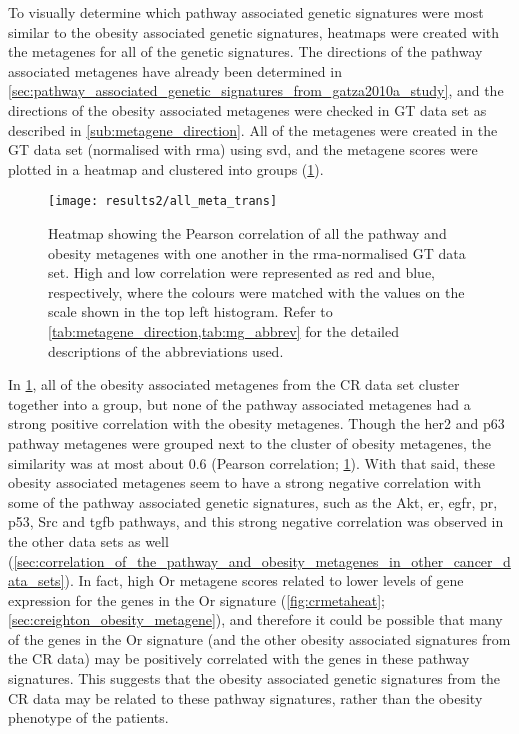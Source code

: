 To visually determine which pathway associated genetic signatures were most similar to the obesity associated genetic signatures, heatmaps were created with the metagenes for all of the genetic signatures.
The directions of the pathway associated metagenes have already been determined in \cref{sec:pathway_associated_genetic_signatures_from_gatza2010a_study}, and the directions of the obesity associated metagenes were checked in GT data set as described in \cref{sub:metagene_direction}.
All of the metagenes were created in the GT data set (normalised with \gls{rma}) using \gls{svd}, and the metagene scores were plotted in a heatmap and clustered into groups (\cref{fig:gatza_allmeta}).

\begin{figure}[htpb]
	\centering
	\texttt{[image: results2/all\_meta\_trans]}
	\caption[Heatmap of the Pearson correlation of all the pathway and obesity metagenes with one another in the \acrshort{rma}-normalised GT data]{Heatmap showing the Pearson correlation of all the pathway and obesity metagenes  with one another  in the \gls{rma}-normalised GT data set.
		High and low correlation were represented as red and blue, respectively, where the colours were matched with the values on the scale shown in the top left histogram.
		Refer to \cref{tab:metagene_direction,tab:mg_abbrev} for the detailed descriptions of the abbreviations used.
		}
	\label{fig:gatza_allmeta}
\end{figure}

In \cref{fig:gatza_allmeta}, all of the obesity associated metagenes from the CR data set cluster together into a group, but none of the pathway associated metagenes had  a strong positive correlation with the obesity metagenes.
Though the  \gls{her2} and p63 pathway metagenes were grouped next to the cluster of obesity metagenes, the similarity was at most about 0.6  (Pearson correlation; \cref{fig:gatza_allmeta}).
With that said, these obesity associated metagenes seem to have a strong negative correlation with some of the pathway associated genetic signatures, such as the Akt, \gls{er}, \gls{egfr}, \gls{pr}, p53, Src and \gls{tgfb} pathways, and this strong negative correlation was observed in the other data sets as well (\cref{sec:correlation_of_the_pathway_and_obesity_metagenes_in_other_cancer_data_sets}).
In fact,  high Or metagene scores related to lower levels of gene expression for the genes in the Or signature (\cref{fig:crmetaheat}; \cref{sec:creighton_obesity_metagene}), and therefore it could be possible that many of the genes in the Or signature (and the other obesity associated signatures from the CR data) may be positively correlated with the genes in these pathway signatures.
This suggests that the obesity associated genetic signatures from the CR data may be related to these pathway signatures, rather than the obesity phenotype of the patients.

